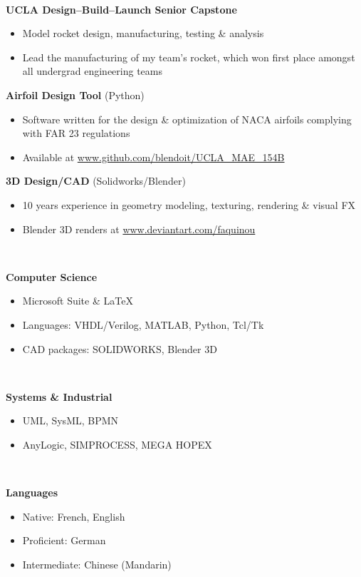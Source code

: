 \documentclass[10pt]{article}
\newcommand{\cvsec}[1]{{\makebox[3cm][l]{\Large\textbf{#1}} \hrulefill\\[6pt]}}
\newcommand{\cventry}[3]{{\large\makebox[3cm][l]{#1} \textbf{#2} #3}}
\begin{document}
\cvsec{Projects}
\cventry{}{UCLA Design--Build--Launch Senior Capstone}{}
\begin{itemize}
    \item Model rocket design, manufacturing, testing \& analysis
    \item Lead the manufacturing of my team's rocket, which won first place amongst all undergrad engineering teams
\end{itemize}
\cventry{}{Airfoil Design Tool}{(Python)}
\begin{itemize}
    \item Software written for the design \& optimization of NACA airfoils complying with FAR 23 regulations
    \item  Available at \url{www.github.com/blendoit/UCLA_MAE_154B}
\end{itemize}
\cventry{}{3D Design/CAD}{(Solidworks/Blender)}
\begin{itemize}
    \item 10 years experience in geometry modeling, texturing, rendering \& visual FX
    \item Blender 3D renders at \url{www.deviantart.com/faquinou}
\end{itemize}


\cvsec{Skills}
\begin{minipage}[t]{0.32\linewidth}
    {\large\textbf{Computer Science}}
    \begin{itemize}[leftmargin=*]
        \item Microsoft Suite \& \LaTeX
        \item Languages: VHDL/Verilog, MATLAB, Python, Tcl/Tk
        \item CAD packages: SOLIDWORKS, Blender 3D
    \end{itemize}
\end{minipage}
~
\begin{minipage}[t]{0.32\linewidth}
    {\large\textbf{Systems \& Industrial}}
    \begin{itemize}[leftmargin=*]
        \item UML, SysML, BPMN
        \item AnyLogic, SIMPROCESS, MEGA HOPEX
    \end{itemize}
\end{minipage}
~
\begin{minipage}[t]{0.32\linewidth}
    {\large\textbf{Languages}}
    \begin{itemize}[leftmargin=*]
        \item Native: French, English
        \item Proficient: German
        \item Intermediate: Chinese (Mandarin)
    \end{itemize}
\end{minipage}
\end{document}
